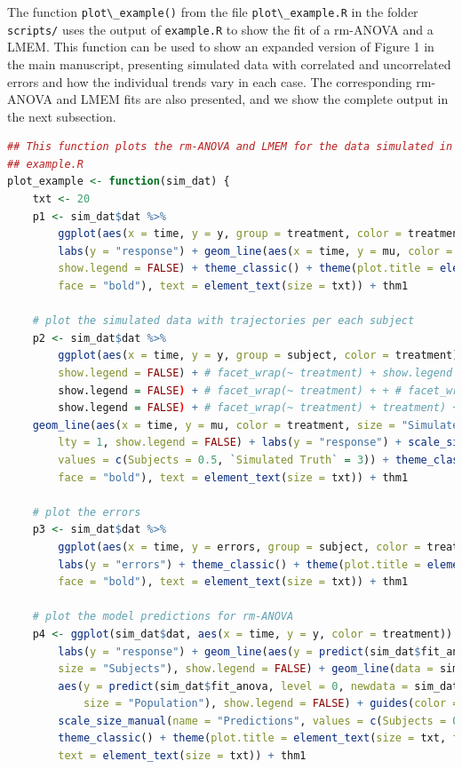 \documentclass[
]{article}
\newcommand{\passthrough}[1]{#1}
\begin{document}
The function \passthrough{\lstinline!plot\_example()!} from the file \passthrough{\lstinline!plot\_example.R!} in the folder \passthrough{\lstinline!scripts/!} uses the output of \passthrough{\lstinline!example.R!} to show the fit of a rm-ANOVA and a LMEM. This function can be used to show an expanded version of Figure 1 in the main manuscript, presenting simulated data with correlated and uncorrelated errors and how the individual trends vary in each case. The corresponding rm-ANOVA and LMEM fits are also presented, and we show the complete output in the next subsection.

\begin{lstlisting}[language=R]
## This function plots the rm-ANOVA and LMEM for the data simulated in
## example.R
plot_example <- function(sim_dat) {
    txt <- 20
    p1 <- sim_dat$dat %>%
        ggplot(aes(x = time, y = y, group = treatment, color = treatment)) + geom_point(show.legend = FALSE) +
        labs(y = "response") + geom_line(aes(x = time, y = mu, color = treatment),
        show.legend = FALSE) + theme_classic() + theme(plot.title = element_text(size = txt,
        face = "bold"), text = element_text(size = txt)) + thm1

    # plot the simulated data with trajectories per each subject
    p2 <- sim_dat$dat %>%
        ggplot(aes(x = time, y = y, group = subject, color = treatment)) + geom_line(aes(size = "Subjects"),
        show.legend = FALSE) + # facet_wrap(~ treatment) + show.legend = FALSE)
        show.legend = FALSE) + # facet_wrap(~ treatment) + + # facet_wrap(~
        show.legend = FALSE) + # facet_wrap(~ treatment) + treatment) +
    geom_line(aes(x = time, y = mu, color = treatment, size = "Simulated Truth"),
        lty = 1, show.legend = FALSE) + labs(y = "response") + scale_size_manual(name = "Type",
        values = c(Subjects = 0.5, `Simulated Truth` = 3)) + theme_classic() + theme(plot.title = element_text(size = txt,
        face = "bold"), text = element_text(size = txt)) + thm1

    # plot the errors
    p3 <- sim_dat$dat %>%
        ggplot(aes(x = time, y = errors, group = subject, color = treatment)) + geom_line(show.legend = FALSE) +
        labs(y = "errors") + theme_classic() + theme(plot.title = element_text(size = txt,
        face = "bold"), text = element_text(size = txt)) + thm1

    # plot the model predictions for rm-ANOVA
    p4 <- ggplot(sim_dat$dat, aes(x = time, y = y, color = treatment)) + geom_point(show.legend = FALSE) +
        labs(y = "response") + geom_line(aes(y = predict(sim_dat$fit_anova), group = subject,
        size = "Subjects"), show.legend = FALSE) + geom_line(data = sim_dat$pred_dat,
        aes(y = predict(sim_dat$fit_anova, level = 0, newdata = sim_dat$pred_dat),
            size = "Population"), show.legend = FALSE) + guides(color = guide_legend(override.aes = list(size = 2))) +
        scale_size_manual(name = "Predictions", values = c(Subjects = 0.5, Population = 3)) +
        theme_classic() + theme(plot.title = element_text(size = txt, face = "bold"),
        text = element_text(size = txt)) + thm1


\end{lstlisting}
\end{document}
